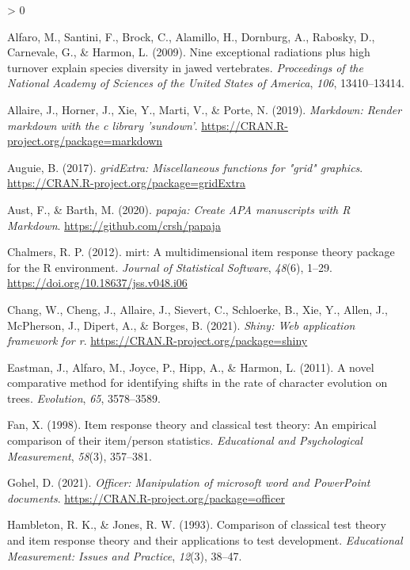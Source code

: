 \documentclass[
  english,
  man]{apa6}
\newlength{\cslhangindent}
\newenvironment{CSLReferences}[2] %
 {%
  \setlength{\parindent}{0pt}
  \ifodd #1 \everypar{\setlength{\hangindent}{\cslhangindent}}\ignorespaces\fi
  \ifnum #2 > 0
  \setlength{\parskip}{#2\baselineskip}
  \fi
 }%
 {}
\begin{document}
\hypertarget{refs}{}
\begin{CSLReferences}{1}{0}
\leavevmode\hypertarget{ref-R-geiger_a}{}%
Alfaro, M., Santini, F., Brock, C., Alamillo, H., Dornburg, A., Rabosky, D., Carnevale, G., \& Harmon, L. (2009). Nine exceptional radiations plus high turnover explain species diversity in jawed vertebrates. \emph{Proceedings of the National Academy of Sciences of the United States of America}, \emph{106}, 13410--13414.

\leavevmode\hypertarget{ref-R-markdown}{}%
Allaire, J., Horner, J., Xie, Y., Marti, V., \& Porte, N. (2019). \emph{Markdown: Render markdown with the c library 'sundown'}. \url{https://CRAN.R-project.org/package=markdown}

\leavevmode\hypertarget{ref-R-gridExtra}{}%
Auguie, B. (2017). \emph{gridExtra: Miscellaneous functions for "grid" graphics}. \url{https://CRAN.R-project.org/package=gridExtra}

\leavevmode\hypertarget{ref-R-papaja}{}%
Aust, F., \& Barth, M. (2020). \emph{{papaja}: {Create} {APA} manuscripts with {R Markdown}}. \url{https://github.com/crsh/papaja}

\leavevmode\hypertarget{ref-R-mirt}{}%
Chalmers, R. P. (2012). {mirt}: A multidimensional item response theory package for the {R} environment. \emph{Journal of Statistical Software}, \emph{48}(6), 1--29. \url{https://doi.org/10.18637/jss.v048.i06}

\leavevmode\hypertarget{ref-R-shiny}{}%
Chang, W., Cheng, J., Allaire, J., Sievert, C., Schloerke, B., Xie, Y., Allen, J., McPherson, J., Dipert, A., \& Borges, B. (2021). \emph{Shiny: Web application framework for r}. \url{https://CRAN.R-project.org/package=shiny}

\leavevmode\hypertarget{ref-R-geiger_b}{}%
Eastman, J., Alfaro, M., Joyce, P., Hipp, A., \& Harmon, L. (2011). A novel comparative method for identifying shifts in the rate of character evolution on trees. \emph{Evolution}, \emph{65}, 3578--3589.

\leavevmode\hypertarget{ref-fan1998item}{}%
Fan, X. (1998). Item response theory and classical test theory: An empirical comparison of their item/person statistics. \emph{Educational and Psychological Measurement}, \emph{58}(3), 357--381.

\leavevmode\hypertarget{ref-R-officer}{}%
Gohel, D. (2021). \emph{Officer: Manipulation of microsoft word and PowerPoint documents}. \url{https://CRAN.R-project.org/package=officer}

\leavevmode\hypertarget{ref-hambleton1993comparison}{}%
Hambleton, R. K., \& Jones, R. W. (1993). Comparison of classical test theory and item response theory and their applications to test development. \emph{Educational Measurement: Issues and Practice}, \emph{12}(3), 38--47.


\end{CSLReferences}
\end{document}
